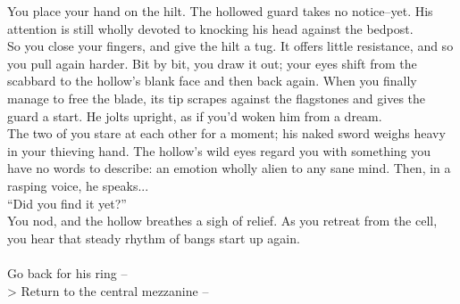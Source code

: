 You place your hand on the hilt. The hollowed guard takes no notice--yet. His attention is still wholly devoted to knocking his head against the bedpost.\\

So you close your fingers, and give the hilt a tug. It offers little resistance, and so you pull again harder. Bit by bit, you draw it out; your eyes shift from the scabbard to the hollow’s blank face and then back again. When you finally manage to free the blade, its tip scrapes against the flagstones and gives the guard a start. He jolts upright, as if you’d woken him from a dream.\\

The two of you stare at each other for a moment; his naked sword weighs heavy in your thieving hand. The hollow’s wild eyes regard you with something you have no words to describe: an emotion wholly alien to any sane mind. Then, in a rasping voice, he speaks...\\

“Did you find it yet?”\\

You nod, and the hollow breathes a sigh of relief. As you retreat from the cell, you hear that steady rhythm of bangs start up again.\\
\\

 Go back for his ring -- \\
> Return to the central mezzanine -- 